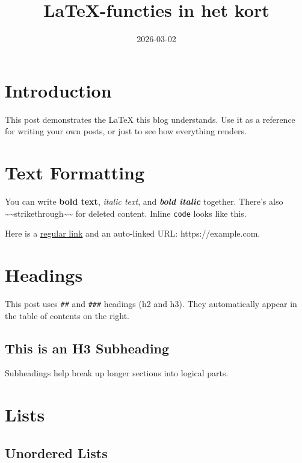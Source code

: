 \title{LaTeX-functies in het kort}
\date{2026-03-02}



\section{Introduction}

This post demonstrates the LaTeX this blog understands. Use it as a reference for writing your own posts, or just to see how everything renders.

\section{Text Formatting}

You can write \textbf{bold text}, \emph{italic text}, and \emph{\textbf{bold italic}} together. There's also \textasciitilde{}\textasciitilde{}strikethrough\textasciitilde{}\textasciitilde{} for deleted content. Inline \texttt{code} looks like this.

Here is a \href{https://example.com}{regular link} and an auto-linked URL: https://example.com.

\section{Headings}

This post uses \texttt{\#\#} and \texttt{\#\#\#} headings (h2 and h3). They automatically appear in the table of contents on the right.

\subsection{This is an H3 Subheading}

Subheadings help break up longer sections into logical parts.

\section{Lists}

\subsection{Unordered Lists}

